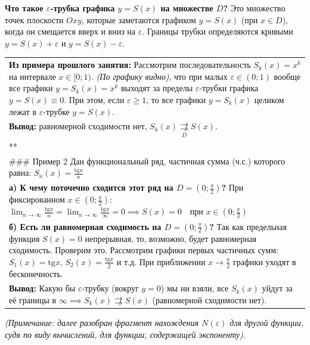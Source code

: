 \documentclass[
  12pt,
  oneside,
  openany]{book}
\newcounter{none} %
\begin{document}
\textbf{Что такое \(\varepsilon\)-трубка графика \(y = S(x)\) на
множестве \(D\)?} Это множество точек плоскости \(Oxy\), которые
заметаются графиком \(y = S(x)\) (при \(x \in D\)), когда он смещается
вверх и вниз на \(\varepsilon\). Границы трубки определяются кривыми
\(y = S(x) + \varepsilon\) и \(y = S(x) - \varepsilon\).

{\def\LTcaptype{none} %
\begin{longtable}[]{@{}
  >{\raggedright\arraybackslash}p{}@{}}
\toprule\noalign{}
\endhead
\bottomrule\noalign{}
\endlastfoot
\textbf{Из примера прошлого занятия:} Рассмотрим последовательность
\(S_k(x) = x^k\) на интервале \(x \in [0; 1)\). \emph{(По графику
видно)}, что при малых \(\varepsilon \in (0; 1)\) вообще все графики
\(y = S_k(x) = x^k\) выходят за пределы \(\varepsilon\)-трубки графика
\(y = S(x) \equiv 0\). При этом, если \(\varepsilon \ge 1\), то все
графики \(y = S_k(x)\) целиком лежат в \(\varepsilon\)-трубке
\(y = S(x)\). \\
\textbf{Вывод:} равномерной сходимости нет,
\(S_k(x) \underset{D}{\not\rightrightarrows} S(x)\). \\
*** \\
\#\#\# Пример 2 Дан функциональный ряд, частичная сумма (ч.с.) которого
равна: \(S_n(x) = \frac{\text{tg} x}{n}\) \\
\textbf{а) К чему поточечно сходится этот ряд на
\(D = \left(0; \frac{\pi}{2}\right)\)?} При фиксированном
\(x \in \left(0; \frac{\pi}{2}\right)\):
\(\lim_{n \to \infty} \frac{\text{tg} x}{n} = \lim_{n \to \infty} \frac{\text{tg} x}{\infty} = 0 \implies S(x) = 0 \quad \text{при } x \in \left(0; \frac{\pi}{2}\right)\) \\
\textbf{б) Есть ли равномерная сходимость на
\(D = \left(0; \frac{\pi}{2}\right)\)?} Так как предельная функция
\(S(x) = 0\) непрерывная, то, возможно, будет равномерная сходимость.
Проверим это. Рассмотрим графики первых частичных сумм:
\(S_1(x) = \text{tg} x\), \(S_2(x) = \frac{\text{tg} x}{2}\) и т.д. При
приближении \(x \to \frac{\pi}{2}\) графики уходят в бесконечность. \\
\textbf{Вывод:} Какую бы \(\varepsilon\)-трубку (вокруг \(y=0\)) мы ни
взяли, все \(S_k(x)\) уйдут за её границы в
\(\infty \implies S_k(x) \not\rightrightarrows S(x)\) (равномерной
сходимости нет). \\
\end{longtable}
}

\emph{(Примечание: далее разобран фрагмент нахождения \(N(\varepsilon)\)
для другой функции, судя по виду вычислений, для функции, содержащей
экспоненту).}
\end{document}
